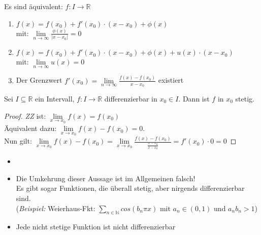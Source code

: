 \setcounter{Satz}{1} 
\setcounter{Definition}{5}

\begin{Satz}{
	Es sind äquivalent: $f : I \rightarrow \mathbb{R}$
	\begin{enumerate}
		\item $f(x) = f(x_0) + f'(x_0) \cdot (x-x_0) + \phi(x) $\\
		 mit: $\lim\limits_{n \rightarrow \infty}{\frac{\phi(x)}{|x-x_0|}} = 0$
	\item $ f(x) = f(x_0) + f'(x_0) \cdot (x-x_0) + \phi(x) + u(x)  \cdot (x-x_0)$ \\
	mit: $\lim\limits_{n \rightarrow \infty}{u(x)} = 0$
	\item Der Grenzwert 
	$f'(x_0) = \lim\limits_{n \rightarrow \infty}{\frac{f(x)-f(x_0)}{x-x_0}}$ 	
	existiert
	\end{enumerate}
}\end{Satz}

\begin{Satz}{\label{satz:satz_3}
	Sei $ I \subseteq \mathbb{R}$ ein Intervall, $f: I \rightarrow \mathbb{R}$ 
	differenzierbar in $x_0 \in I$. Dann ist $f$ in $x_0$ stetig.
}\end{Satz}

\begin{proof}
	\textit{ZZ}  ist: $\lim\limits_{x \rightarrow x_0}{f(x) = f(x_0)}$ \\
		\noindent\hspace*{10mm}
		Äquivalent dazu: $\lim\limits_{x \rightarrow x_0}{f(x)-f(x_0) = 0}$. \\
		\noindent\hspace*{10mm}
		Nun gilt: $\lim\limits_{x \rightarrow x_0}{f(x) - f(x_0)} = 
	 \lim\limits_{x \rightarrow x_0}{\frac{f(x)-f(x_0)}{\frac{x-x_0}{x-x_0}}}
	 = f'(x_0) \cdot 0 = 0 $
\end{proof}
		
\begin{Bemerkung}{
	 \begin{itemize}
	 	\item[ ]
	 	\item Die Umkehrung dieser Aussage ist im Allgemeinen falsch! \\
	 	Es gibt sogar Funktionen, die überall stetig, aber nirgends 
	 	differenzierbar sind. \\
	 	(\textit{Beispiel:} Weierhaus-Fkt: $\sum_{n \in \mathbb{N}} cos(b_n \pi x)$
	 	mit $a_n \in (0,1)$ und $a_n b_n >1$)
	 	\item Jede nicht stetige Funktion ist nicht differenzierbar
	 \end{itemize}	 
}\end{Bemerkung}

